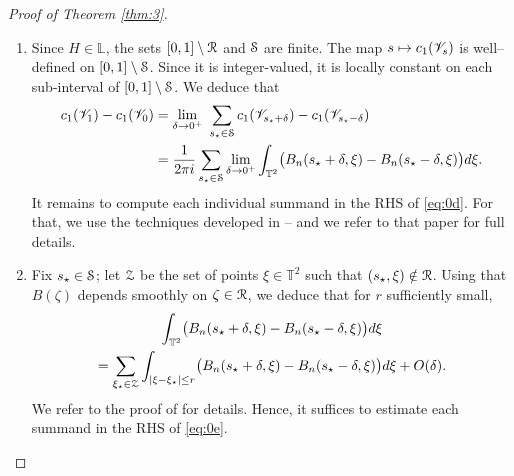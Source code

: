 \documentclass[11pt]{article}
\newcommand{\eg}{e.g.,\xspace}
\numberwithin{equation}{section}
\let\pazocal\EuScript
\def\mto{\mathchoice{\longmapsto}{\mapsto}{\mapsto}{\mapsto}}
\theoremstyle{definition}
\DeclareMathOperator{\Id}{Id}
\DeclareMathOperator{\Tr}{Tr}
\newcommand{\EE}{\pazocal{E}}
\newcommand{\RRR}{\pazocal{R}}
\newcommand{\SSS}{{\pazocal{S}}}
\newcommand{\ZZZ}{{\pazocal{Z}}}
\newcommand{\VVV}{{\mathscr{V}}}
\newcommand{\Ll}{\mathbb{L}}
\newcommand{\Tt}{{\mathbb{T}}}
\newcommand{\tsigma}{{\tilde{\sigma}}}
\newcommand{\lr}[1]{\langle #1 \rangle}
\begin{document}
\begin{proof}[Proof of Theorem \ref{thm:3}]
\begin{enumerate}
In Step 6, we will use the space of $2 \times 2$ traceless Hermitian matrices $\EE_0$. This space is equipped with the Hermitian inner product $\lr{T_1,T_2} = \Tr(T_1T_2)$; the Pauli matrices $\sigma_1, \sigma_2, \sigma_3$ form an orthonormal basis. If $\tsigma_1, \tsigma_2, \tsigma_3$ is another orthonormal basis, then there exists $U \in SU(2)$ (unique up to multiplication by $\pm \Id_2$) and $\epsilon \in \{\pm 1\}$ such that
\begin{equation}\label{eq:0h}
\tsigma_k = \epsilon \cdot U \sigma_k U^*, \quad 1 \leq k \leq 3.
\end{equation}
This is precisely the content of the isomorphism between $SU(2) / \{\pm \Id_2\}$ and $SO(3)$; see \eg \cite[\S4.2]{S05}. The number $\epsilon \in \{\pm 1\}$ reads as the determinant of the (orthogonal) matrix of the basis $(\tsigma_1, \tsigma_2, \tsigma_3)$ in the basis $(\sigma_1, \sigma_2, \sigma_3)$.

\item
Since $H \in \Ll$, the sets $[0,1] \setminus \RRR$ and $\SSS$ are finite. The map $s \mto c_1(\VVV_s)$ is well--defined on $[0,1] \setminus \SSS$. Since it is integer-valued, it is locally constant on each sub-interval of $[0,1] \setminus \SSS$. We deduce that
\begin{equation}\label{eq:0d}
\begin{split}
c_1(\VVV_1) - c_1(\VVV_0) &= \lim_{\delta \to 0^+} \ \sum_{s_\star \in \SSS} c_1(\VVV_{s_\star+\delta}) - c_1(\VVV_{s_\star-\delta})
\\
&= \dfrac{1}{2\pi i} \sum_{s_\star \in \SSS} \lim_{\delta \to 0^+} \int_{\Tt^2} \bigl(B_n(s_\star+\delta,\xi) - B_n(s_\star-\delta,\xi) \bigr) d\xi.
\end{split}
\end{equation}
It remains to compute each individual summand in the RHS of \eqref{eq:0d}. For that, we use the techniques developed in \cite[\S2]{D19b} -- and we refer to that paper for full details.

\item
Fix $s_\star \in \SSS$; let $\ZZZ$ be the set of points $\xi \in \Tt^2$ such that $(s_\star,\xi) \notin \RRR$. Using that $B(\zeta)$ depends smoothly on $\zeta \in \RRR$, we deduce that for $r$ sufficiently small,
\begin{multline}\label{eq:0e}
\int_{\Tt^2} \bigl(B_n(s_\star+\delta,\xi) - B_n(s_\star-\delta,\xi) \bigr) d\xi\\
= \sum_{\xi_\star \in \ZZZ} \int_{|\xi-\xi_\star| \leq r} \bigl(B_n(s_\star+\delta,\xi) - B_n(s_\star-\delta,\xi) \bigr) d\xi + O(\delta).
\end{multline}
We refer to the proof of \cite[Lem.\,2.1]{D19b} for details. Hence, it suffices to estimate each summand in the RHS of \eqref{eq:0e}.


\end{enumerate}
\end{proof}
\end{document}
